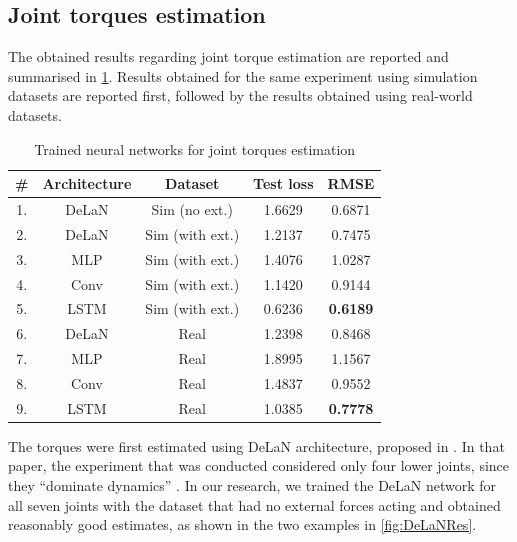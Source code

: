\subsection{Joint torques estimation}
\label{sec:ResJoint}

The obtained results regarding joint torque estimation are reported and summarised in \cref{tab:NetworksFrankaTorqueRes}. Results obtained for the same experiment using simulation datasets are reported first, followed by the results obtained using real-world datasets.

\begin{table}
    \centering
    \caption{Trained neural networks for joint torques estimation}
    \label{tab:NetworksFrankaTorqueRes}
    \begin{tabular}{ccccc}
        \toprule
        \textbf{\#} & \textbf{Architecture} & \textbf{Dataset} & \textbf{Test loss} & \textbf{RMSE} \\
        \midrule
        1. & DeLaN & Sim (no ext.) & 1.6629 & 0.6871 \\ %
        2. & DeLaN & Sim (with ext.) & 1.2137 & 0.7475 \\ %
        3. & MLP & Sim (with ext.) & 1.4076 & 1.0287 \\ %
        4. & Conv & Sim (with ext.) & 1.1420 & 0.9144 \\ %
        5. & LSTM & Sim (with ext.) & 0.6236 & \textbf{0.6189}\\ %
        \midrule
        6. & DeLaN & Real & 1.2398 & 0.8468\\ %
        7. & MLP & Real & 1.8995 & 1.1567\\%
        8. & Conv & Real & 1.4837 & 0.9552\\ %
        9. & LSTM & Real & 1.0385 &\textbf{0.7778}\\ %
        \bottomrule
    \end{tabular}
\end{table}

The torques were first estimated using DeLaN architecture, proposed in \cite{Lutter2019}. In that paper, the experiment that was conducted considered only four lower joints, since they ``dominate dynamics'' \cite{Lutter2019}. In our research, we trained the DeLaN network for all seven joints with the dataset that had no external forces acting and obtained reasonably good estimates, as shown in the two examples in \cref{fig:DeLaNRes}.

